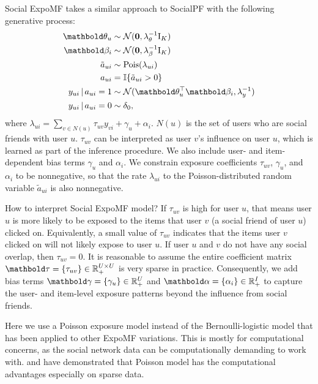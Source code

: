 Social ExpoMF takes a similar approach to SocialPF \citep{chaney2015probabilistic} with the following generative process:
\begin{equation*}
	\begin{split}
	\mb\theta_{u} &\sim \cN(\bzero, \lambda_\theta^{-1} \mathrm{I}_K) \\
	\mb\beta_{i} &\sim \cN(\bzero, \lambda_\beta^{-1} \mathrm{I}_K)  \\
	\tilde{a}_{ui} &\sim \pois(\lambda_{ui}) \\
	a_{ui} &= \mathbb{I}\{\tilde{a}_{ui} > 0\}\\
	y_{ui} \g a_{ui} = 1 &\sim \cN(\mb\theta_u^\top \mb\beta_i, \lambda_y^{-1}) \\
	y_{ui} \g a_{ui} = 0 &\sim \delta_0,
	\end{split}
	\label{chpt:expomf:eq:social_expomf}
 \end{equation*}
where $\lambda_{ui} = \sum_{v\in N(u)} \tau_{uv} y_{vi} + \gamma_u + \alpha_i$. $N(u)$ is the set of users who are social friends with user $u$. $\tau_{uv}$ can be interpreted as user $v$'s influence on user $u$, which is learned as part of the inference procedure. We also include user- and item-dependent bias terms $\gamma_u$ and $\alpha_i$. We constrain exposure coefficients $\tau_{uv}$, $\gamma_u$, and $\alpha_i$ to be nonnegative, so that the rate $\lambda_{ui}$ to the Poisson-distributed random variable $\tilde{a}_{ui}$ is also nonnegative. 

How to interpret Social ExpoMF model? If $\tau_{uv}$ is high for user $u$, that means user $u$ is more likely to be exposed to the items that user $v$ (a social friend of user $u$) clicked on. Equivalently, a small value of $\tau_{uv}$ indicates that the items user $v$ clicked on will not likely expose to user $u$. If user $u$ and $v$ do not have any social overlap, then $\tau_{uv} = 0$. It is reasonable to assume the entire coefficient matrix $\mb\tau = \{\tau_{uv}\}\in \RR_+^{U\times U}$ is very sparse in practice. Consequently, we add bias terms $\mb\gamma = \{\gamma_u\} \in \RR_+^U$ and $\mb\alpha = \{\alpha_i\} \in \RR_+^I$ to capture the user- and item-level exposure patterns beyond the influence from social friends.  

Here we use a Poisson exposure model instead of the Bernoulli-logistic model that has been applied to other ExpoMF variations. This is mostly for computational concerns, as the social network data can be computationally demanding to work with. \citet{Gopalan:2015} and \citet{chaney2015probabilistic} have demonstrated that Poisson model has the computational advantages especially on sparse data. 

